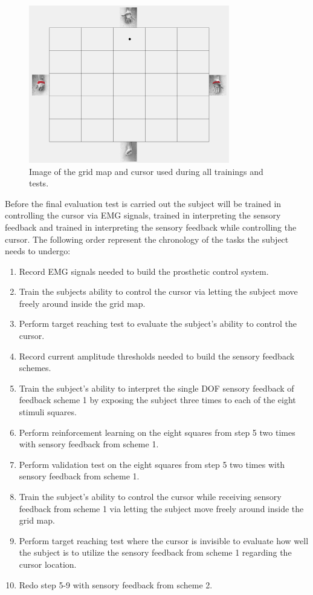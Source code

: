 \begin{figure}[H]                 
	\includegraphics[width=0.78\textwidth]{figures/gridmap}  
	\caption{Image of the grid map and cursor used during all trainings and tests.}
	\label{fig:gridmap} 
\end{figure}

Before the final evaluation test is carried out the subject will be trained in controlling the cursor via EMG signals, trained in interpreting the sensory feedback and trained in interpreting the sensory feedback while controlling the cursor. The following order represent the chronology of the tasks the subject needs to undergo:

\begin{enumerate}
	\item Record EMG signals needed to build the prosthetic control system.
	\item Train the subjects ability to control the cursor via letting the subject move freely around inside the grid map.
	\item Perform target reaching test to evaluate the subject's ability to control the cursor.
	\item Record current amplitude thresholds needed to build the sensory feedback schemes.
	\item Train the subject's ability to interpret the single DOF sensory feedback of feedback scheme 1 by exposing the subject three times to each of the eight stimuli squares.
	\item Perform reinforcement learning on the eight squares from step 5 two times with sensory feedback from scheme 1.
	\item Perform validation test on the eight squares from step 5 two times with sensory feedback from scheme 1.
	\item Train the subject's ability to control the cursor while receiving sensory feedback from scheme 1 via letting the subject move freely around inside the grid map.
	\item Perform target reaching test where the cursor is invisible to evaluate how well the subject is to utilize the sensory feedback from scheme 1 regarding the cursor location.
	\item Redo step 5-9 with sensory feedback from scheme 2.
\end{enumerate}


